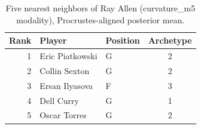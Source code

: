 \begin{table}[htbp]
  \centering\small
  \begin{tabular}{rllc}
    \toprule
    Rank & Player & Position & Archetype \\
    \midrule
    1 & Eric Piatkowski & G & 2 \\
    2 & Collin Sexton & G & 2 \\
    3 & Ersan Ilyasova & F & 3 \\
    4 & Dell Curry & G & 1 \\
    5 & Oscar Torres & G & 2 \\
    \bottomrule
  \end{tabular}
  \caption{Five nearest neighbors of Ray Allen (curvature_m5 modality), Procrustes-aligned posterior mean.}
  \label{tab:Ray_Allen_neighbors_curvature_m5}
\end{table}

